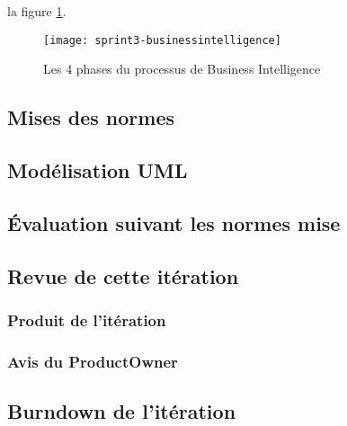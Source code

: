 la figure \ref{fig:sprint3-businessintelligence}.

\begin{figure}[htbp]
  \centering
  \texttt{[image: sprint3-businessintelligence]}
  \caption{Les 4 phases du processus de Business Intelligence}
  \label{fig:sprint3-businessintelligence}
\end{figure}

\subsection{Mises des normes}

\subsection{Modélisation UML}

\subsection{Évaluation suivant les normes mise}
\subsection{Revue de cette itération}
\subsubsection{Produit de l'itération}
\subsubsection{Avis du ProductOwner}

\subsection{Burndown de l’itération}
